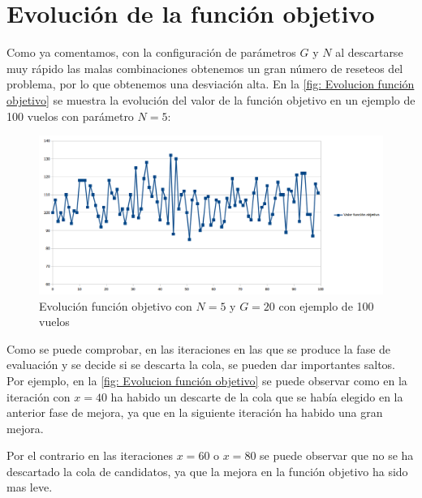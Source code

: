 \section{Evolución de la función objetivo}
Como ya comentamos, con la configuración de parámetros $G$ y $N$ al descartarse muy rápido las malas combinaciones obtenemos un gran número de reseteos del problema, por lo que obtenemos una desviación alta. En la \autoref{fig: Evolucion función objetivo} se muestra la evolución del valor de la función objetivo en un ejemplo de 100 vuelos con parámetro $N=5$: 
\begin{figure}[H]
	\begin{center}
		\centering
		\includegraphics[width=1\textwidth]{./imagenes/resultados/evolucionFuncionObjetivo.png}
		\caption{Evolución función objetivo con $N=5$ y $G=20$ con ejemplo de 100 vuelos}
		\label{fig: Evolucion función objetivo}
	\end{center}
\end{figure}
Como se puede comprobar, en las iteraciones en las que se produce la fase de evaluación y se decide si se descarta la cola, se pueden dar importantes saltos. Por ejemplo, en la \autoref{fig: Evolucion función objetivo} se puede observar como en la iteración con $x=40$ ha habido un descarte de la cola que se había elegido en la anterior fase de mejora, ya que en la siguiente iteración ha habido una gran mejora.

Por el contrario en las iteraciones $x=60$ o $x=80$ se puede observar que no se ha descartado la cola de candidatos, ya que la mejora en la función objetivo ha sido mas leve.

